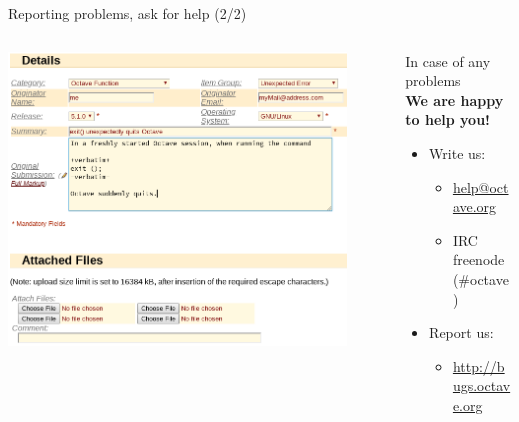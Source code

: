 \begin{frame}{Reporting problems, ask for help (2/2)}
\begin{columns}
\begin{column}{0.55\textwidth}
\includegraphics[width=0.9\textwidth]{res/images/savannah_bug_report}
\end{column}
\begin{column}{0.45\textwidth}
In case of any problems\\[0.8em]

\textbf{We are happy to help you!}\\[1em]
\begin{itemize}
\itemsep1em
\item
Write us:
\begin{itemize}
\itemsep1em
\item
{\color{DarkBlue}\url{help@octave.org}}
\item
IRC freenode (\#octave)
\end{itemize}
\item
Report us:
\begin{itemize}
\item
{\color{DarkBlue}\url{http://bugs.octave.org}}
\end{itemize}
\end{itemize}
\bigskip\bigskip
\end{column}
\end{columns}
\end{frame}
